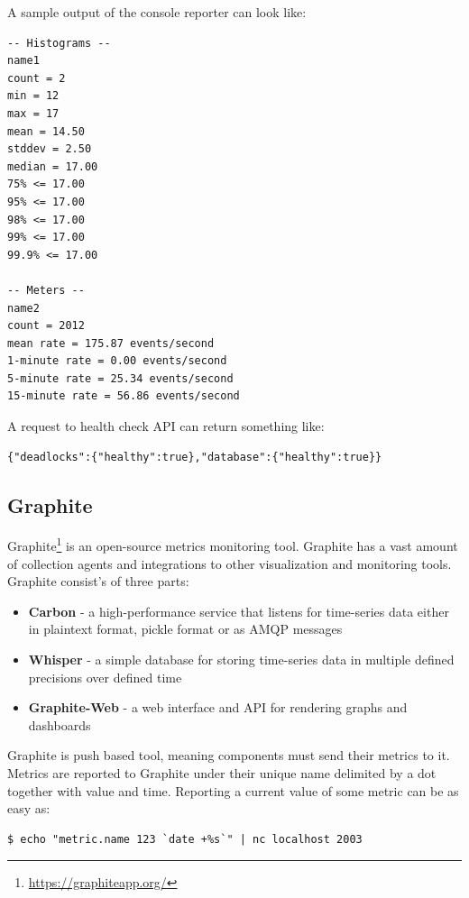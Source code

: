 \documentclass[12pt,oneside]{fithesis2}
\begin{document}
A sample output of the console reporter can look like:
\begin{lstlisting}[caption = Metrics console reporter output, label = spanmanager, style=eclipse_java]
-- Histograms --
name1
count = 2
min = 12
max = 17
mean = 14.50
stddev = 2.50
median = 17.00
75% <= 17.00
95% <= 17.00
98% <= 17.00
99% <= 17.00
99.9% <= 17.00
 
-- Meters --
name2
count = 2012
mean rate = 175.87 events/second
1-minute rate = 0.00 events/second
5-minute rate = 25.34 events/second
15-minute rate = 56.86 events/second
\end{lstlisting}

A request to health check API can return something like:\newline

\begin{verbatim}
{"deadlocks":{"healthy":true},"database":{"healthy":true}}
\end{verbatim}

\subsection{Graphite}

Graphite\footnote{\url{https://graphiteapp.org/}} is an open-source metrics monitoring tool. Graphite has a vast amount of collection agents and integrations to other visualization and monitoring tools. Graphite consist's of three parts:

\begin{itemize}
\item \textbf{Carbon} - a high-performance service that listens for time-series data either in plaintext format, pickle format or as AMQP messages
\item \textbf{Whisper} - a simple database for storing time-series data in multiple defined precisions over defined time
\item \textbf{Graphite-Web} - a web interface and API for rendering graphs and dashboards
\end{itemize}

Graphite is push based tool, meaning components must send their metrics to it. Metrics are reported to Graphite under their unique name delimited by a dot together with value and time. Reporting a current value of some metric can be as easy as:\newline

\begin{verbatim}
$ echo "metric.name 123 `date +%s`" | nc localhost 2003
\end{verbatim}
\end{document}

